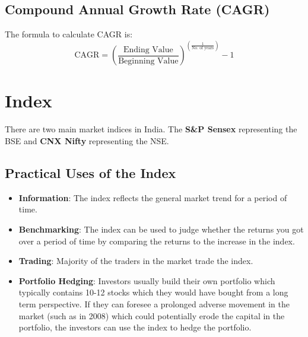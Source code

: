 \subsection{Compound Annual Growth Rate (CAGR)}
The formula to calculate CAGR is:
\begin{displaymath}
  \textrm{CAGR} = \left( \frac{\textrm{Ending Value}}{\textrm{Beginning Value}} \right)^{\left( \frac{1}{\textrm{No. of years}} \right)} - 1
\end{displaymath}


\section{Index}
There are two main market indices in India. The \textbf{S\&P Sensex} representing the BSE and \textbf{CNX Nifty} representing the NSE.

\subsection{Practical Uses of the Index}
\begin{itemize}
  \item \textbf{Information}: The index reflects the general market trend for a period of time.
  \item \textbf{Benchmarking}: The index can be used to judge whether the returns you got over a period of time by comparing the returns to the increase in the index.
  \item \textbf{Trading}: Majority of the traders in the market trade the index.
  \item \textbf{Portfolio Hedging}: Investors usually build their own portfolio which typically contains 10-12 stocks which they would have bought from a long term perspective. If they can foresee a prolonged adverse movement in the market (such as in 2008) which could potentially erode the capital in the portfolio, the investors can use the index to hedge the portfolio.
\end{itemize}


